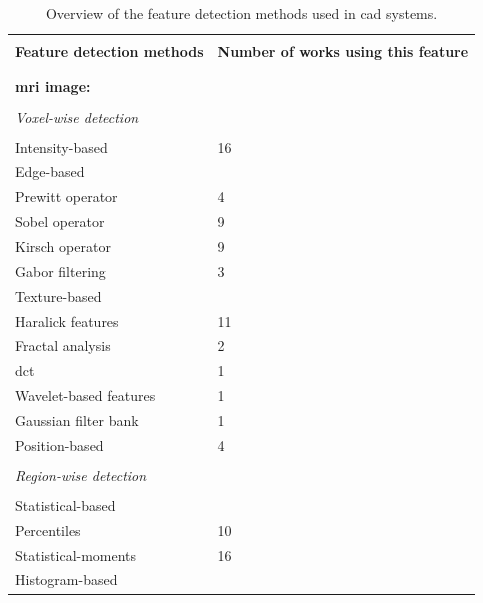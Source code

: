 \documentclass[num-refs]{wiley-article}
\begin{document}
\begin{table}
  \centering
  \caption{Overview of the feature detection methods used in \ac{cad} systems.}\label{tab:feat}
  \footnotesize
  \begin{threeparttable}
    \renewcommand{\arraystretch}{.7}
    \begin{tabular}{p{.5\linewidth} p{.4\linewidth}}
      \hline \\ [-1.5ex]
      \textbf{Feature detection methods} & \textbf{Number of works using this feature} \\ \\ [-1.5ex]
      \hline \\ [-1.5ex]
      \textbf{\ac{mri} image:} & \\ \\ [-1.5ex]
      \quad \textit{Voxel-wise detection} &  \\ \\ [-1.5ex]
      \quad \quad Intensity-based & 16 \\ %
      \quad \quad Edge-based & \\
      \quad \quad \quad Prewitt operator & 4 \\
      \quad \quad \quad Sobel operator & 9 \\
      \quad \quad \quad Kirsch operator & 9 \\
      \quad \quad \quad Gabor filtering & 3 \\
      \quad \quad Texture-based & \\
      \quad \quad \quad Haralick features & 11 \\
      \quad \quad \quad Fractal analysis & 2 \\
      \quad \quad \quad \Ac{dct} & 1 \\
      \quad \quad \quad Wavelet-based features & 1 \\
      \quad \quad \quad Gaussian filter bank & 1 \\
      \quad \quad Position-based &  4 \\ \\ [-1.5ex]
      \quad \textit{Region-wise detection} &  \\ \\ [-1.5ex]
      \quad \quad Statistical-based & \\
      \quad \quad \quad Percentiles & 10 \\
      \quad \quad \quad Statistical-moments & 16 \\
      \quad \quad Histogram-based & \\

\end{tabular}
\end{threeparttable}
\end{table}
\end{document}
